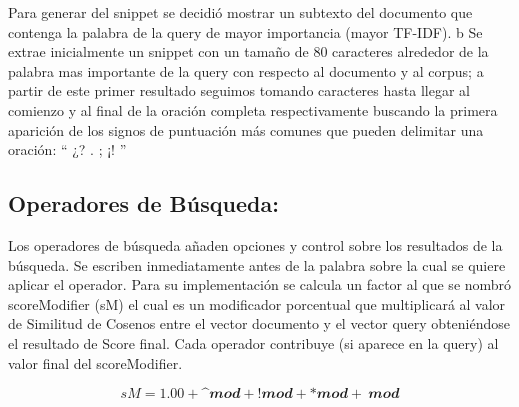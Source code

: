 \documentclass[a4paper,12pt,twocolumn]{article}
\begin{document}
Para generar del snippet se decidió mostrar un subtexto del documento que contenga la palabra
de la query de mayor importancia (mayor TF-IDF). b Se extrae inicialmente un snippet con un
tamaño de 80 caracteres alrededor de la palabra mas importante de la query con respecto al
documento y al corpus; a partir de este primer resultado seguimos tomando caracteres hasta
llegar al comienzo y al final de la oración completa respectivamente buscando la primera
aparición de los signos de puntuación más comunes que pueden delimitar una oración: “ ¿? .
; ¡! ”

\subsection{Operadores de Búsqueda:}
Los operadores de búsqueda añaden opciones y control sobre los resultados de la búsqueda.
Se escriben inmediatamente antes de la palabra sobre la cual se quiere aplicar el operador.
Para su implementación se calcula un factor al que se nombró scoreModifier (sM) el cual es un
modificador porcentual que multiplicará al valor de Similitud de Cosenos entre el vector
documento y el vector query obteniéndose el resultado de Score final. Cada operador contribuye
(si aparece en la query) al valor final del scoreModifier.
    \begin{center}
    \begin{equation}
       sM = 1.00 + \^ 𝒎𝒐𝒅 + !𝒎𝒐𝒅 +  *𝒎𝒐𝒅 + ~𝒎𝒐𝒅 
    \end{equation}
    \end{center}
\end{document}
